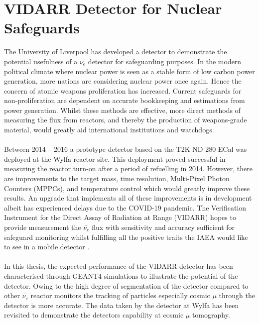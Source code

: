 \section{VIDARR Detector for Nuclear Safeguards}
The University of Liverpool has developed a detector to demonstrate the potential usefulness of a $\bar{\nu_e}$ detector for safeguarding purposes. In the modern political climate where nuclear power is seen as a stable form of low carbon power generation, more nations are considering nuclear power once again. Hence the concern of atomic weapons proliferation has increased. Current safeguards for non-proliferation are dependent on accurate bookkeeping and estimations from power generation. Whilst these methods are effective, more direct methods of measuring the flux from reactors, and thereby the production of weapons-grade material, would greatly aid international institutions and watchdogs.
\\\\Between 2014 -- 2016 a prototype detector based on the T2K ND 280 ECal \cite{Allan_2013} was deployed at the Wylfa reactor site. This deployment proved successful in measuring the reactor turn-on after a period of refuelling in 2014. However, there are improvements to the target mass, time resolution, Multi-Pixel Photon Counters (MPPCs), and temperature control which would greatly improve these results. An upgrade that implements all of these improvements is in development albeit has experienced delays due to the COVID-19 pandemic. The Verification Instrument for the Direct Assay of Radiation at Range (VIDARR) hopes to provide measurement the $\bar{\nu_e}$ flux with sensitivity and accuracy sufficient for safeguard monitoring whilst fulfilling all the positive traits the IAEA would like to see in a mobile detector \cite{IAEA_2008}.
\\\\In this thesis, the expected performance of the VIDARR detector has been characterised through GEANT4 \cite{Agostinelli:2002hh} simulations to illustrate the potential of the detector. Owing to the high degree of segmentation of the detector compared to other $\bar{\nu_e}$ reactor monitors the tracking of particles especially cosmic $\mu$ through the detector is more accurate. The data taken by the detector at Wylfa has been revisited to demonstrate the detectors capability at cosmic $\mu$ tomography.

